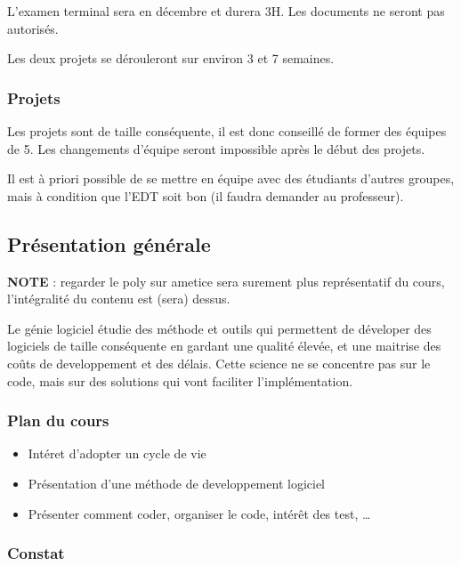 L'examen terminal sera en décembre et durera 3H. Les documents ne seront
pas autorisés.

Les deux projets se dérouleront sur environ 3 et 7 semaines.

\hypertarget{projets}{%
\subsubsection{Projets}\label{projets}}

Les projets sont de taille conséquente, il est donc conseillé de former
des équipes de 5. Les changements d'équipe seront impossible après le
début des projets.

Il est à priori possible de se mettre en équipe avec des étudiants
d'autres groupes, mais à condition que l'EDT soit bon (il faudra
demander au professeur).

\hypertarget{pruxe9sentation-guxe9nuxe9rale}{%
\subsection{Présentation
générale}\label{pruxe9sentation-guxe9nuxe9rale}}

\textbf{NOTE} : regarder le poly sur ametice sera surement plus
représentatif du cours, l'intégralité du contenu est (sera) dessus.

Le génie logiciel étudie des méthode et outils qui permettent de
déveloper des logiciels de taille conséquente en gardant une qualité
élevée, et une maitrise des coûts de developpement et des délais. Cette
science ne se concentre pas sur le code, mais sur des solutions qui vont
faciliter l'implémentation.

\hypertarget{plan-du-cours}{%
\subsubsection{Plan du cours}\label{plan-du-cours}}

\begin{itemize}
\tightlist
\item
  Intéret d'adopter un cycle de vie
\item
  Présentation d'une méthode de developpement logiciel
\item
  Présenter comment coder, organiser le code, intérêt des test, \ldots{}
\end{itemize}

\hypertarget{constat}{%
\subsubsection{Constat}\label{constat}}

